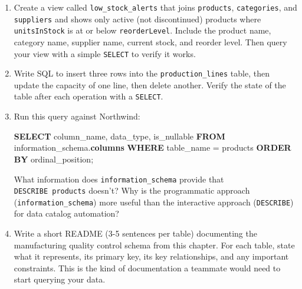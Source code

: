 \documentclass[
  letterpaper,
  DIV=11,
  numbers=noendperiod]{scrreprt}
\newenvironment{Shaded}{\begin{snugshade}}{\end{snugshade}}
\newcommand{\KeywordTok}[1]{\textcolor[rgb]{0.00,0.23,0.31}{\textbf{#1}}}
\newcommand{\NormalTok}[1]{\textcolor[rgb]{0.00,0.23,0.31}{#1}}
\newcommand{\OperatorTok}[1]{\textcolor[rgb]{0.37,0.37,0.37}{#1}}
\newcommand{\StringTok}[1]{\textcolor[rgb]{0.13,0.47,0.30}{#1}}
\begin{document}
\begin{tcolorbox}[enhanced jigsaw, opacitybacktitle=0.6, arc=.35mm, colback=white, bottomtitle=1mm, opacityback=0, toprule=.15mm, left=2mm, colbacktitle=quarto-callout-note-color!10!white, breakable, coltitle=black, toptitle=1mm, colframe=quarto-callout-note-color-frame, bottomrule=.15mm, titlerule=0mm, title=\textcolor{quarto-callout-note-color}{\faInfo}\hspace{0.5em}{Exercises}, rightrule=.15mm, leftrule=.75mm]

\begin{enumerate}
\def\labelenumi{\arabic{enumi}.}
\item
  Create a view called \texttt{low\_stock\_alerts} that joins
  \texttt{products}, \texttt{categories}, and \texttt{suppliers} and
  shows only active (not discontinued) products where
  \texttt{unitsInStock} is at or below \texttt{reorderLevel}. Include
  the product name, category name, supplier name, current stock, and
  reorder level. Then query your view with a simple \texttt{SELECT} to
  verify it works.
\item
  Write SQL to insert three rows into the \texttt{production\_lines}
  table, then update the capacity of one line, then delete another.
  Verify the state of the table after each operation with a
  \texttt{SELECT}.
\item
  Run this query against Northwind:

  \begin{codelisting}

  \caption{\texttt{duckdb}}

\begin{Shaded}
\begin{Highlighting}[]
\KeywordTok{SELECT}\NormalTok{ column\_name, data\_type, is\_nullable}
\KeywordTok{FROM}\NormalTok{ information\_schema.}\KeywordTok{columns}
\KeywordTok{WHERE}\NormalTok{ table\_name }\OperatorTok{=} \StringTok{\textquotesingle{}products\textquotesingle{}}
\KeywordTok{ORDER} \KeywordTok{BY}\NormalTok{ ordinal\_position;}
\end{Highlighting}
\end{Shaded}

  \end{codelisting}

  What information does \texttt{information\_schema} provide that
  \texttt{DESCRIBE\ products} doesn't? Why is the programmatic approach
  (\texttt{information\_schema}) more useful than the interactive
  approach (\texttt{DESCRIBE}) for data catalog automation?
\item
  Write a short README (3-5 sentences per table) documenting the
  manufacturing quality control schema from this chapter. For each
  table, state what it represents, its primary key, its key
  relationships, and any important constraints. This is the kind of
  documentation a teammate would need to start querying your data.
\end{enumerate}

\end{tcolorbox}
\end{document}
